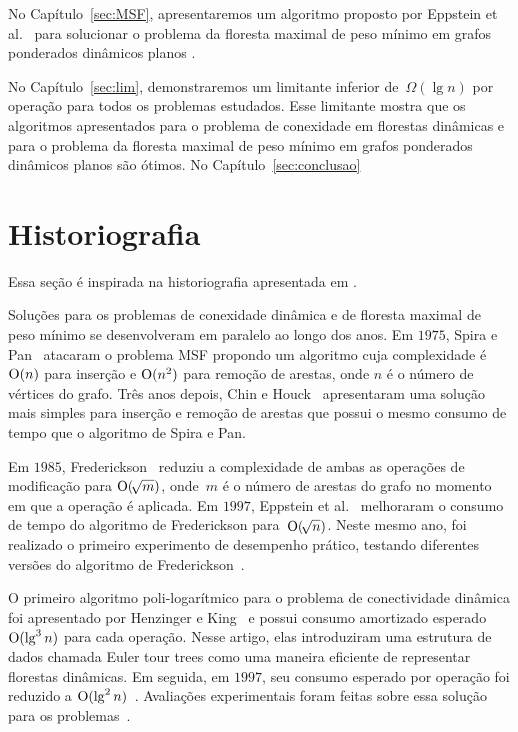 No Capítulo~\ref{sec:MSF}, apresentaremos um algoritmo proposto por Eppstein et al.~\cite{EPPSTEIN-planar} para solucionar o problema da floresta maximal de peso mínimo em grafos ponderados dinâmicos planos . 

No Capítulo~\ref{sec:lim}, demonstraremos um limitante inferior de~$\Omega(\lg n)$ por operação para todos os problemas estudados. Esse limitante mostra que os algoritmos apresentados para o problema de conexidade em florestas dinâmicas e para o problema da floresta maximal de peso mínimo em grafos ponderados dinâmicos planos são ótimos.
No Capítulo~\ref{sec:conclusao} 

\section{Historiografia}

Essa seção é inspirada na historiografia apresentada em \cite{QC22, HHSRecentAdvances2022, bruceM}.

Soluções para os problemas de conexidade dinâmica e de floresta maximal de peso mínimo se desenvolveram em paralelo ao longo dos anos. Em $1975$, Spira e Pan~\cite{SP1975} atacaram o problema MSF propondo um algoritmo cuja complexidade é $\mathrm{O}(n)$ para inserção e $\mathrm{O}(n^2)$ para remoção de arestas, onde $n$ é o número de vértices do grafo. Três anos depois, Chin e Houck~\cite{CH1978} apresentaram uma solução mais simples para inserção e remoção de arestas que possui o mesmo consumo de tempo que o algoritmo de Spira e Pan.

Em $1985$, Frederickson~\cite{frederickson1983data} reduziu a complexidade de ambas as operações de modificação para $\mathrm{O}(\!\sqrt{m})$, onde~$m$ é o número de arestas do grafo no momento em que a operação é aplicada.
Em $1997$, Eppstein et al.~\cite{Eppstein1992SparsificationaTF} melhoraram o consumo de tempo do algoritmo de Frederickson para~$\mathrm{O}(\!\sqrt{n})$.
Neste mesmo ano, foi realizado o primeiro experimento de desempenho prático, testando diferentes versões do algoritmo de Frederickson~\cite{xpAnalyGiuseppe}.

O primeiro algoritmo poli-logarítmico para o problema de conectividade dinâmica foi apresentado por Henzinger e King~\cite{HenzingerKing} e possui consumo amortizado esperado $\mathrm{O}(\lg^3 n)$ para cada operação. Nesse artigo, elas introduziram uma estrutura de dados chamada Euler tour trees como uma maneira eficiente de representar florestas dinâmicas. Em seguida, em $1997$, seu consumo esperado por operação foi reduzido a $\mathrm{O}(\lg^2 n)$~\cite{HenzingerThorup}.  Avaliações experimentais foram feitas sobre essa solução para os problemas~\cite{EmpiricalStudy1997, EmpiricalStudy2002, Zaroliagis2002}.

